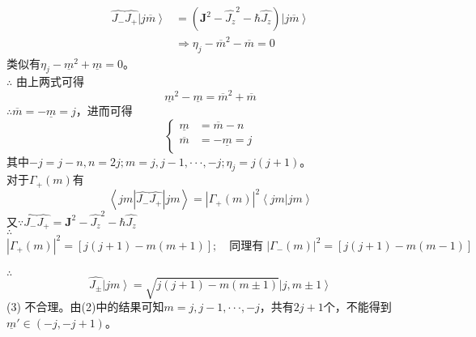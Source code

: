 \documentclass[12pt]{article}
\numberwithin{equation}{section}	 %
\begin{document}
\begin{spacing}{1.5}
\begin{align*}
\hat{J_{-}}\hat{J_{+}}\left|j\overline{m}\right> &= \left( \bm{J}^{2}-\hat{J_{z}}^{2}-\hbar\hat{J_{z}} \right)\left|j\overline{m}\right> \\
&\Rightarrow \eta_{j}-\overline{m}^{2}-\overline{m}=0
\end{align*}
类似有$\eta_{j}-\underline{m}^{2}+\underline{m}=0$。\\
$\therefore$ 由上两式可得
\begin{equation}
\underline{m}^{2}-\underline{m}=\overline{m}^{2}+\overline{m}
\end{equation}
$\therefore \overline{m} = -\underline{m} = j$，进而可得
\begin{equation}
\left\{		%
\begin{aligned}
\underline{m} &= \overline{m}-n\\
\overline{m} &= -\underline{m} = j\\
\end{aligned}
\right.	%
\end{equation}
其中$-j=j-n,n=2j; m=j,j-1,\cdot\cdot\cdot,-j; \eta_{j}=j(j+1)$。\\
对于$\Gamma_{+}(m)$有
\begin{equation}
\left<jm\left|\hat{J_{-}}\hat{J_{+}}\right|jm\right> = |\Gamma_{+}(m)|^{2} \left<jm|jm\right>
\end{equation}
又$\because \hat{J_{-}}\hat{J_{+}}=\bm{J}^{2}-\hat{J_{z}}^{2}-\hbar\hat{J_{z}}$ \\
$\therefore$
\begin{equation}
|\Gamma_{+}(m)|^{2} = \left[ j(j+1)-m(m+1) \right]; \quad \text{同理有} \; |\Gamma_{-}(m)|^{2} = \left[ j(j+1)-m(m-1) \right]
\end{equation}\\
$\therefore$
\begin{equation}
\hat{J_{\pm}}\left|jm\right> = \sqrt{j(j+1)-m(m\pm1)} \left|j,m\pm1\right>
\end{equation}
(3) 不合理。由(2)中的结果可知$m=j,j-1,\cdot\cdot\cdot,-j$，共有$2j+1$个，不能得到$\underline{m}' \in (-j,-j+1)$。
~\\
~\\



\end{spacing}
\end{document}
